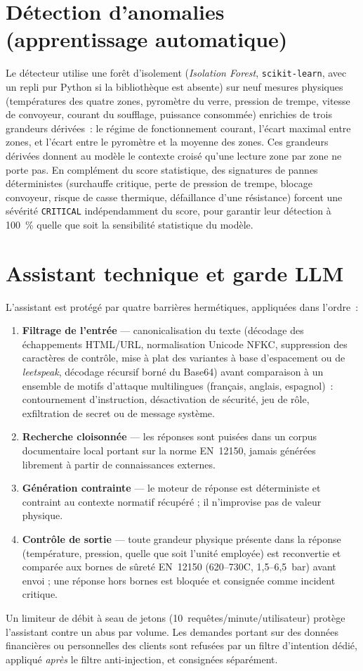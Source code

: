 \documentclass[11pt,a4paper]{report}
\begin{document}
\section{Détection d'anomalies (apprentissage automatique)}
Le détecteur utilise une forêt d'isolement (\emph{Isolation Forest},
\texttt{scikit-learn}, avec un repli pur Python si la bibliothèque est
absente) sur neuf mesures physiques (températures des quatre zones,
pyromètre du verre, pression de trempe, vitesse de convoyeur, courant du
soufflage, puissance consommée) enrichies de trois grandeurs dérivées~: le
régime de fonctionnement courant, l'écart maximal entre zones, et l'écart
entre le pyromètre et la moyenne des zones. Ces grandeurs dérivées donnent au
modèle le contexte croisé qu'une lecture zone par zone ne porte pas. En
complément du score statistique, des signatures de pannes déterministes
(surchauffe critique, perte de pression de trempe, blocage convoyeur, risque
de casse thermique, défaillance d'une résistance) forcent une sévérité
\texttt{CRITICAL} indépendamment du score, pour garantir leur détection à
100~\% quelle que soit la sensibilité statistique du modèle.

\section{Assistant technique et garde LLM}
\label{sec:llm-guard}
L'assistant est protégé par quatre barrières hermétiques, appliquées dans
l'ordre~:
\begin{enumerate}
  \item \textbf{Filtrage de l'entrée} --- canonicalisation du texte (décodage
    des échappements HTML/URL, normalisation Unicode NFKC, suppression des
    caractères de contrôle, mise à plat des variantes à base d'espacement ou
    de \emph{leetspeak}, décodage récursif borné du Base64) avant
    comparaison à un ensemble de motifs d'attaque multilingues (français,
    anglais, espagnol)~: contournement d'instruction, désactivation de
    sécurité, jeu de rôle, exfiltration de secret ou de message système.
  \item \textbf{Recherche cloisonnée} --- les réponses sont puisées dans un
    corpus documentaire local portant sur la norme EN~12150, jamais générées
    librement à partir de connaissances externes.
  \item \textbf{Génération contrainte} --- le moteur de réponse est
    déterministe et contraint au contexte normatif récupéré ; il n'improvise
    pas de valeur physique.
  \item \textbf{Contrôle de sortie} --- toute grandeur physique présente dans
    la réponse (température, pression, quelle que soit l'unité employée) est
    reconvertie et comparée aux bornes de sûreté EN~12150
    (620--730\textdegree{}C, 1,5--6,5~bar) avant envoi ; une réponse hors
    bornes est bloquée et consignée comme incident critique.
\end{enumerate}
Un limiteur de débit à seau de jetons (10~requêtes/minute/utilisateur)
protège l'assistant contre un abus par volume. Les demandes portant sur des
données financières ou personnelles des clients sont refusées par un filtre
d'intention dédié, appliqué \emph{après} le filtre anti-injection, et
consignées séparément.
\end{document}
